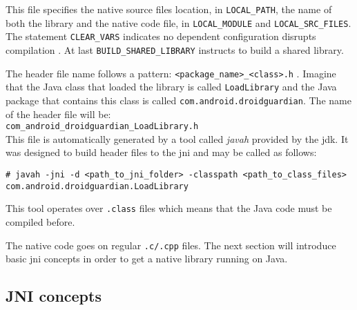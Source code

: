 This file specifies the native source files location, in \texttt{LOCAL\_PATH}, the name of both the library and the native code file, in \texttt{LOCAL\_MODULE} and \texttt{LOCAL\_SRC\_FILES}. The statement \texttt{CLEAR\_VARS} indicates no dependent configuration disrupts compilation \cite{AndroidNDK:Packt}. At last \texttt{BUILD\_SHARED\_LIBRARY} instructs to build a shared library.

The header file name follows a pattern: \texttt{<package\_name>\_<class>.h} . Imagine that the Java class that loaded the library is called \texttt{LoadLibrary} and the Java package that contains this class is called \texttt{com.android.droidguardian}. The name of the header file will be: \\
\texttt{com\_android\_droidguardian\_LoadLibrary.h}\\
\noindent This file is automatically generated by a tool called \textit{javah} provided by the \gls{jdk}. It was designed to build header files to the \gls{jni} and may be called as follows:

\begin{lstlisting}[style=BashInputStyle]
# javah -jni -d <path_to_jni_folder> -classpath <path_to_class_files> com.android.droidguardian.LoadLibrary
\end{lstlisting}

This tool operates over \texttt{.class} files which means that the Java code must be compiled before.

The native code goes on regular \texttt{.c/.cpp} files. The next section will introduce basic \gls{jni} concepts in order to get a native library running on Java.

\subsection{JNI concepts}


